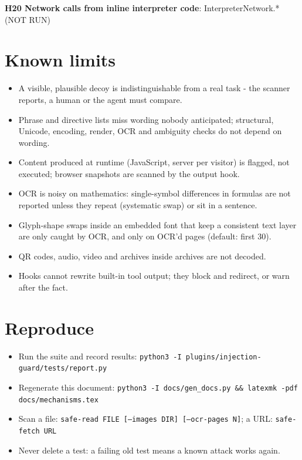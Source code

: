 \documentclass[10pt,a4paper]{article}
\begin{document}
\textbf{H20 Network calls from inline interpreter code}: \textcolor{bad}{InterpreterNetwork.\allowbreak{}*  (NOT RUN)}\par
\normalsize\section{Known limits}
\begin{itemize}[nosep]
\item A visible, plausible decoy is indistinguishable from a real task - the scanner reports, a human or the agent must compare.
\item Phrase and directive lists miss wording nobody anticipated; structural, Unicode, encoding, render, OCR and ambiguity checks do not depend on wording.
\item Content produced at runtime (JavaScript, server per visitor) is flagged, not executed; browser snapshots are scanned by the output hook.
\item OCR is noisy on mathematics: single-symbol differences in formulas are not reported unless they repeat (systematic swap) or sit in a sentence.
\item Glyph-shape swaps inside an embedded font that keep a consistent text layer are only caught by OCR, and only on OCR'd pages (default: first 30).
\item QR codes, audio, video and archives inside archives are not decoded.
\item Hooks cannot rewrite built-in tool output; they block and redirect, or warn after the fact.
\end{itemize}
\section{Reproduce}
\begin{itemize}[nosep]
\item Run the suite and record results: \texttt{python3 -I plugins/injection-guard/tests/report.py}
\item Regenerate this document: \texttt{python3 -I docs/gen\_docs.py \&\& latexmk -pdf docs/mechanisms.tex}
\item Scan a file: \texttt{safe-read FILE [--images DIR] [--ocr-pages N]}; a URL: \texttt{safe-fetch URL}
\item Never delete a test: a failing old test means a known attack works again.
\end{itemize}
\end{document}
